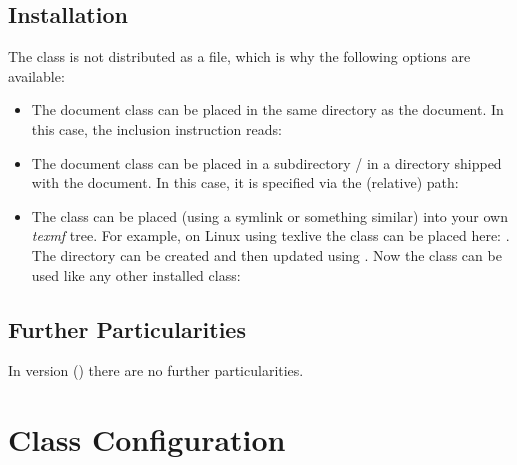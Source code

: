 \documentclass[useartcl,notoc]{sopra-paper}
\begin{document}
\subsection{Installation}
    The class is not distributed as a  file, which is why the
    following options are available:
    \begin{itemize}
        \item The document class can be placed in the same directory as the document.
                In this case, the inclusion instruction reads:
        \item The document class can be placed in a subdirectory / in a
                directory shipped with the document. In
                this case, it is specified via the (relative) path:
        \item The class can be placed (using a symlink or something similar)
              into your own \emph{texmf} tree.
              For example, on Linux using texlive
              the class can be placed here: .
              The directory can be created and then updated using
              . Now
              the class can be used like any other installed class:
    \end{itemize}
    \subsection{Further Particularities}
    In version \thesopversion{} () there are no further
    particularities.

\section{Class Configuration}
\end{document}
